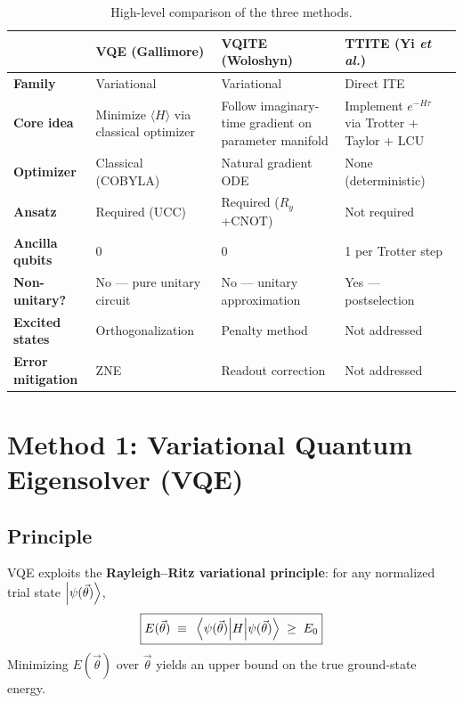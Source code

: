 \documentclass[11pt,a4paper]{article}
\begin{document}
\begin{table}[h]
\centering
\small
\begin{tabular}{@{}l p{3.8cm} p{3.8cm} p{3.8cm}@{}}
\toprule
& \textbf{VQE} (Gallimore) & \textbf{VQITE} (Woloshyn) & \textbf{TTITE} (Yi \emph{et al.}) \\
\midrule
\textbf{Family}
& Variational & Variational & Direct ITE \\
\textbf{Core idea}
& Minimize $\langle H \rangle$ via classical optimizer
& Follow imaginary-time gradient on parameter manifold
& Implement $e^{-H\tau}$ via Trotter + Taylor + LCU \\
\textbf{Optimizer}
& Classical (COBYLA)
& Natural gradient ODE
& None (deterministic) \\
\textbf{Ansatz}
& Required (UCC)
& Required ($R_y$+CNOT)
& Not required \\
\textbf{Ancilla qubits}
& 0
& 0
& 1 per Trotter step \\
\textbf{Non-unitary?}
& No --- pure unitary circuit
& No --- unitary approximation
& Yes --- postselection \\
\textbf{Excited states}
& Orthogonalization
& Penalty method
& Not addressed \\
\textbf{Error mitigation}
& ZNE
& Readout correction
& Not addressed \\
\bottomrule
\end{tabular}
\caption{High-level comparison of the three methods.}
\label{tab:overview}
\end{table}


\section{Method 1: Variational Quantum Eigensolver (VQE)}
\label{sec:vqe}

\subsection{Principle}

VQE exploits the \textbf{Rayleigh--Ritz variational principle}: for any
normalized trial state $\ket{\psi(\vec\theta)}$,
\begin{equation}
  \boxed{E(\vec\theta) \;\equiv\; \mel{\psi(\vec\theta)}{H}{\psi(\vec\theta)}
    \;\geq\; E_0}
  \label{eq:variational}
\end{equation}
Minimizing $E(\vec\theta)$ over $\vec\theta$ yields an upper bound on the
true ground-state energy.
\end{document}
